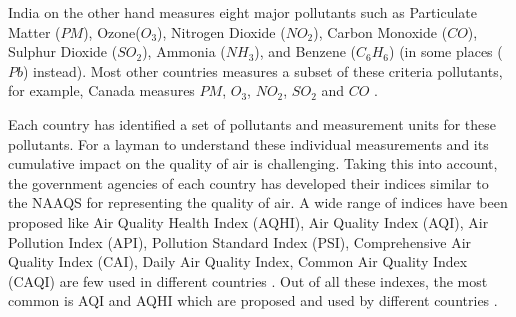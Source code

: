 India on the other hand measures eight major pollutants such as Particulate Matter ($PM$), Ozone($O_3$), Nitrogen Dioxide ($NO_2$), Carbon Monoxide ($CO$), Sulphur Dioxide ($SO_2$), Ammonia ($NH_3$), and Benzene ($C_6H_6$) (in some places ($Pb$) instead). Most other countries measures a subset of these criteria pollutants, for example, Canada measures $PM$, $O_3$, $NO_2$, $SO_2$ and $CO$ \cite{Chen2013}. 


Each country has identified a set of pollutants and measurement units for these pollutants. %
For a layman to understand these individual measurements and its cumulative impact on the quality of air is challenging. 
Taking this into account, the government agencies of each country has developed their indices similar to the NAAQS for representing the quality of air. A wide range of indices have been proposed like Air Quality Health Index (AQHI), Air Quality Index (AQI), Air Pollution Index (API), Pollution Standard Index (PSI), Comprehensive Air Quality Index (CAI), Daily Air Quality Index, Common Air Quality Index (CAQI) are few used in different countries \cite{WinNT}. Out of all these indexes, the most common is AQI and AQHI which are proposed and used by different countries \cite{Chen2013}.


